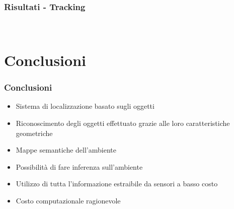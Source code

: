 \documentclass[c]{beamer}
\begin{document}
\begin{frame}
\frametitle{Risultati - Tracking}
 \\
\vskip -0.5cm
\end{frame}



\section{Conclusioni}
\begin{frame}
\frametitle{Conclusioni}
\begin{itemize}
 \item Sistema di localizzazione basato sugli oggetti
 \item Riconoscimento degli oggetti effettuato grazie alle loro caratteristiche geometriche
 \item Mappe semantiche dell'ambiente
 \item Possibilità di fare inferenza sull'ambiente
 \item Utilizzo di tutta l'informazione estraibile da sensori a basso costo
 \item Costo computazionale ragionevole 
\end{itemize}


\end{frame}
\end{document}
